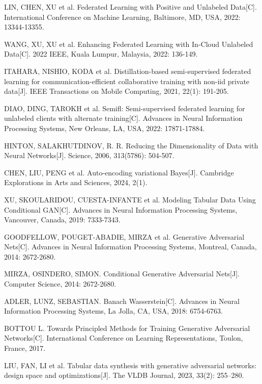 \begin{thebibliography}{200}
	LIN, CHEN, XU et al. Federated Learning with Positive and Unlabeled Data[C]. International Conference on Machine Learning, Baltimore, MD, USA, 2022: 13344-13355.
	
	WANG, XU, XU et al. Enhancing Federated Learning with In-Cloud Unlabeled Data[C]. 2022 IEEE, Kuala Lumpur, Malaysia, 2022: 136-149.
	
	ITAHARA, NISHIO, KODA et al. Distillation-based semi-supervised federated learning for communication-efficient collaborative training with non-iid private data[J]. IEEE Transactions on Mobile Computing, 2021, 22(1): 191-205.
	
	DIAO, DING, TAROKH et al. Semifl: Semi-supervised federated learning for unlabeled clients with alternate training[C]. Advances in Neural Information Processing Systems, New Orleans, LA, USA, 2022: 17871-17884.
	
	HINTON, SALAKHUTDINOV, R. R. Reducing the Dimensionality of Data with Neural Networks[J]. Science, 2006, 313(5786): 504-507.
	
	CHEN, LIU, PENG et al. Auto-encoding variational Bayes[J]. Cambridge Explorations in Arts and Sciences, 2024, 2(1).
	
	XU, SKOULARIDOU, CUESTA-INFANTE et al. Modeling Tabular Data Using Conditional GAN[C]. Advances in Neural Information Processing Systems, Vancouver, Canada, 2019: 7333-7343.
	
	GOODFELLOW, POUGET-ABADIE, MIRZA et al. Generative Adversarial Nets[C]. Advances in Neural Information Processing Systems, Montreal, Canada, 2014: 2672-2680.
	
	MIRZA, OSINDERO, SIMON. Conditional Generative Adversarial Nets[J]. Computer Science, 2014: 2672-2680.
	
	ADLER, LUNZ, SEBASTIAN. Banach Wasserstein[C]. Advances in Neural Information Processing Systems, La Jolla, CA, USA, 2018: 6754-6763.
	
	BOTTOU L. Towards Principled Methods for Training Generative Adversarial Networks[C]. International Conference on Learning Representations, Toulon, France, 2017.
	
	LIU, FAN, LI et al. Tabular data synthesis with generative adversarial networks: design space and optimizations[J]. The VLDB Journal, 2023, 33(2): 255–280.
	

\end{thebibliography}
